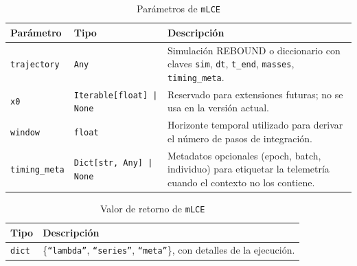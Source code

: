 \begin{table}[H]
  \centering
  \caption{Parámetros de \texttt{mLCE}}
  \small
  \begin{tabularx}{\textwidth}{@{}p{}p{}X@{}}
    \toprule
    \textbf{Parámetro} & \textbf{Tipo} & \textbf{Descripción} \\
    \midrule
    \texttt{trajectory} & \texttt{Any} & Simulación REBOUND o diccionario con claves \texttt{sim}, \texttt{dt}, \texttt{t\_end}, \texttt{masses}, \texttt{timing\_meta}. \\
    \texttt{x0} & \texttt{Iterable[float] | None} & Reservado para extensiones futuras; no se usa en la versión actual. \\
    \texttt{window} & \texttt{float} & Horizonte temporal utilizado para derivar el número de pasos de integración. \\
    \texttt{timing\_meta} & \texttt{Dict[str, Any] | None} & Metadatos opcionales (epoch, batch, individuo) para etiquetar la telemetría cuando el contexto no los contiene. \\
    \bottomrule
  \end{tabularx}
\end{table}
\vspace{0.2cm}

\begin{table}[H]
  \centering
  \caption{Valor de retorno de \texttt{mLCE}}
  \small
  \begin{tabularx}{\textwidth}{@{}p{}X@{}}
    \toprule
    \textbf{Tipo} & \textbf{Descripción} \\
    \midrule
    \texttt{dict} & \{\texttt{``lambda''}, \texttt{``series''}, \texttt{``meta''}\}, con detalles de la ejecución. \\
    \bottomrule
  \end{tabularx}
\end{table}
\vspace{0.2cm}

